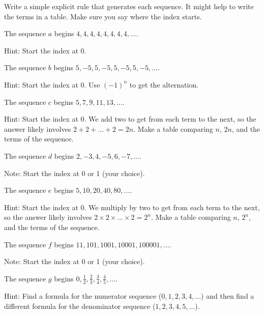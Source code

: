 \begin{act}
\label{act_next_term_explicit}
    Write a simple explicit rule that generates each sequence.  It might help to write the terms in a table.  Make sure you say where the index starts.
        \begin{actpart}
            \item The sequence $a$ begins $4,4,4,4,4,4,4,4,\ldots$. 
            
            Hint: Start the index at 0.
            
            \item The sequence $b$ begins $5,-5,5,-5,5,-5,5,-5,\ldots$. 
            
            Hint: Start the index at 0.  Use $(-1)^n$ to get the alternation.
            
            \item The sequence $c$ begins $5, 7, 9, 11, 13,\ldots$. 
            
            Hint: Start the index at 0. We add two to get from each term to the next, so the answer likely involves $2+2+\ldots +2 = 2n$. Make a table comparing $n$, $2n$, and the terms of the sequence.

            \item The sequence $d$ begins $2, -3, 4, -5, 6, -7,\ldots$.  
            
            Note: Start the index at 0 or 1 (your choice).
      
            \item The sequence $e$ begins $5,10,20,40,80, \ldots$.  
            
            Hint: Start the index at 0. We multiply by two to get from each term to the next, so the answer likely involves $2\times 2 \times \ldots \times 2 = 2^n$. Make a table comparing $n$, $2^n$, and the terms of the sequence.

            \item The sequence $f$ begins $11, 101, 1001, 10001, 100001, \ldots$. 
            
            Note: Start the index at 0 or 1 (your choice).
            
            \item The sequence $g$ begins $0, \frac{1}{2}, \frac{2}{3}, \frac{3}{4}, \frac{4}{5}, \ldots$.  

            Hint: Find a formula for the numerator sequence ($0,1,2,3,4,\ldots$) and then find a different formula for the denominator sequence ($1,2,3,4,5,\ldots$).
            

\end{actpart}
\end{act}
